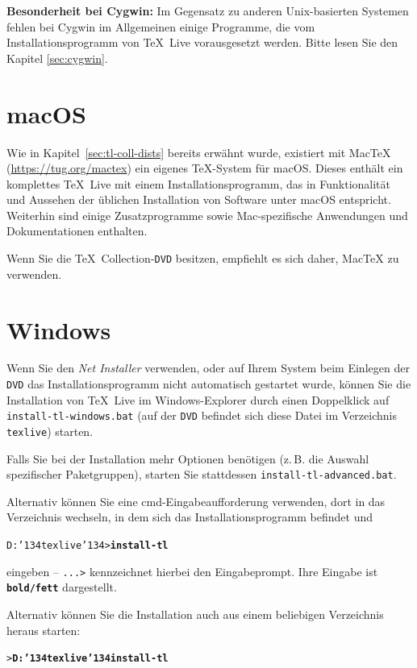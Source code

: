 \documentclass[12pt,ngerman,a4paper,fullparskip]{report}
\newcommand{\TL}{\TeX\ Live\xspace}
\newcommand{\acro}[1]{\texttt{#1}}
\newcommand{\filename}[1]{\texttt{#1}}
\newcommand{\Ucom}[1]{\textbf{\texttt{#1}}}
\newcommand{\bs}{\protect\normalfont\ttfamily\char'134}
\def\TK{\TeX\ Collection}
\providecommand*{\DVD}{\acro{DVD}\xspace}
\providecommand*{\macOS}{macOS\xspace}
\begin{document}
\textbf{Besonderheit bei Cygwin:} Im Gegensatz zu anderen Unix-basierten
Systemen fehlen bei Cygwin im Allgemeinen einige Programme, die vom Installationsprogramm von \TL vorausgesetzt werden. Bitte lesen Sie den Kapitel \ref{sec:cygwin}.


\section{\macOS}

Wie in Kapitel~\ref{sec:tl-coll-dists} bereits erwähnt wurde, existiert mit Mac\TeX{} (\url{https://tug.org/mactex}) ein eigenes \TeX-System für \macOS. Dieses enthält ein komplettes \TL mit einem Installationsprogramm, das in Funktionalität und Aussehen  der üblichen Installation von Software unter \macOS entspricht. Weiterhin sind einige Zusatzprogramme sowie Mac-spezifische Anwendungen und Dokumentationen enthalten.

Wenn Sie die \TK-\DVD besitzen, empfiehlt es sich daher, Mac\TeX{} zu verwenden.

\section{Windows}

Wenn Sie den \emph{Net Installer} verwenden, oder auf Ihrem System beim Einlegen der \DVD das Installationsprogramm nicht automatisch gestartet wurde, können Sie die Installation von \TL im Windows-Explorer durch einen Doppelklick auf \filename{install-tl-windows.bat} (auf der \DVD befindet sich diese Datei im Verzeichnis \texttt{texlive}) starten.

Falls Sie bei der Installation mehr Optionen benötigen (z.\,B. die Auswahl
spezifischer Paketgruppen), starten Sie stattdessen \filename{install-tl-advanced.bat}.

Alternativ können Sie eine cmd-Eingabeaufforderung verwenden, dort in das Verzeichnis wechseln, in dem sich das Installationsprogramm befindet und 

\begin{alltt}
D:\bs{}texlive\bs{}> \Ucom{install-tl}
\end{alltt}

eingeben -- \texttt{...>} kennzeichnet hierbei den Eingabeprompt. Ihre Eingabe ist \Ucom{\texttt{bold/fett}} dargestellt.

Alternativ können Sie die Installation auch aus einem beliebigen Verzeichnis heraus starten:

\begin{alltt}
> \Ucom{D:\bs{}texlive\bs{}install-tl}
\end{alltt}
\end{document}
